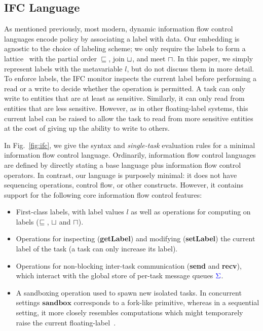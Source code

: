 \documentclass{llncs}
\begin{document}
\subsection{IFC Language}

As mentioned previously, most modern, dynamic information flow control
languages encode policy by associating a label with data.  Our
embedding is agnostic to the choice of labeling scheme; we only require
the labels to form a lattice~\cite{Denning:1976:LMS:360051.360056} with
the partial order $\sqsubseteq$, join \ensuremath{\lub}, and meet \ensuremath{\glb}.  In this
paper, we simply represent labels with the metavariable $l$, but do not
discuss them in more detail.
To enforce labels, the IFC monitor inspects the
current label  before performing a read or a write to decide whether the operation is permitted.
A task can only write to entities that are at least as sensitive.
Similarly, it can only read from entities that are less sensitive.
However, as in other floating-label systems, this current label can be raised
to allow the task to read from more sensitive entities at the cost of giving up
the ability to write to others. 

In Fig.~\ref{fig:ifc}, we give the syntax and \emph{single-task}
evaluation rules for a minimal information flow control language.
Ordinarily, information flow control languages are defined by directly
stating a base language plus information flow control operators.  In
contrast, our language is purposely minimal: it does not have sequencing
operations, control flow, or other constructs.  However, it contains
support for the following core information flow control features:

\begin{itemize}
    \item First-class labels, with label values $l$ as well as operations for computing on
labels (\ensuremath{\flows{}}, \ensuremath{\lub} and \ensuremath{\glb}).
    \item Operations for inspecting (\textbf{getLabel}) and modifying
    (\textbf{setLabel}) the current label of the task (a task can only increase its label).
    \item Operations for non-blocking inter-task communication (\textbf{send}
    and \textbf{recv}), which interact with the global store of per-task
    message queues \ensuremath{\ifc{\Sigma}}.
\item A sandboxing operation used to spawn new isolated tasks. In
    concurrent settings \ensuremath{\mathbf{sandbox}} corresponds to a fork-like primitive,
    whereas in a
    sequential setting, it more closely resembles
    computations which might temporarely raise the current
    floating-label~\cite{lio,Hritcu:2013:YIB:2497621.2498098}.

\end{itemize}
\end{document}

